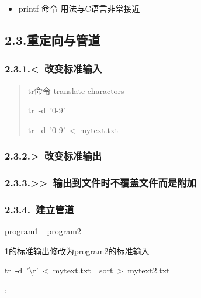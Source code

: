 \documentclass{article}
\begin{document}
\begin{itemize}[noitemsep,topsep=\mdcompacttopsep]%

\item printf 命令
用法与C语言非常接近%
\end{itemize}%

\subsection{2.3.\hspace*{0.5em}重定向与管道}\label{section}%

\subsubsection{2.3.1.\hspace*{0.5em}\textless{}~改变标准输入}\label{sec--}%

\begin{quote}%

\noindent tr命令\mdbr
translate charactors%
\begin{mdpre}%
\noindent{}tr~-d~'0-9'%
\end{mdpre}
\begin{mdpre}%
\noindent{}tr~-d~'0-9'~\textless{}~mytext.txt%
\end{mdpre}
\end{quote}%

\subsubsection{2.3.2.\hspace*{0.5em}\textgreater{}~改变标准输出}\label{sec--}%

\subsubsection{2.3.3.\hspace*{0.5em}\textgreater{}\textgreater{}~输出到文件时不覆盖文件而是附加}\label{sec--}%

\subsubsection{2.3.4.\hspace*{0.5em}\textbar{}~建立管道}\label{sec--}%
\begin{mdpre}%
\noindent{}program1~\textbar{}~program2%
\end{mdpre}1的标准输出修改为program2的标准输入
\begin{mdpre}%
\noindent{}tr~-d~'\textbackslash{}r'~\textless{}~mytext.txt~\textbar{}~sort~\textgreater{}~mytext2.txt%
\end{mdpre}:
\end{document}
